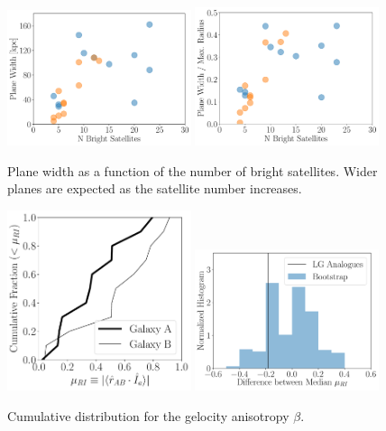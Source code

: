 \documentclass[a4paper,fleqn,usenatbib]{mnras}
\begin{document}
\begin{figure}
\centering
\includegraphics[width=0.48\textwidth]{planes.pdf}
\includegraphics[width=0.48\textwidth]{planes_normalized.pdf}
\caption{
Plane width as a function of the number of bright satellites.
Wider planes are expected as the satellite number increases.
\label{fig:planes}}
\end{figure}


\begin{figure}
\centering
\includegraphics[width=0.48\textwidth]{mu_ri_cum.pdf}
\includegraphics[width=0.48\textwidth]{mu_ri_bootstrap.pdf}
\caption{
Cumulative distribution for the gelocity anisotropy $\beta$.
\label{fig:mu_ri}}
\end{figure}
\end{document}
